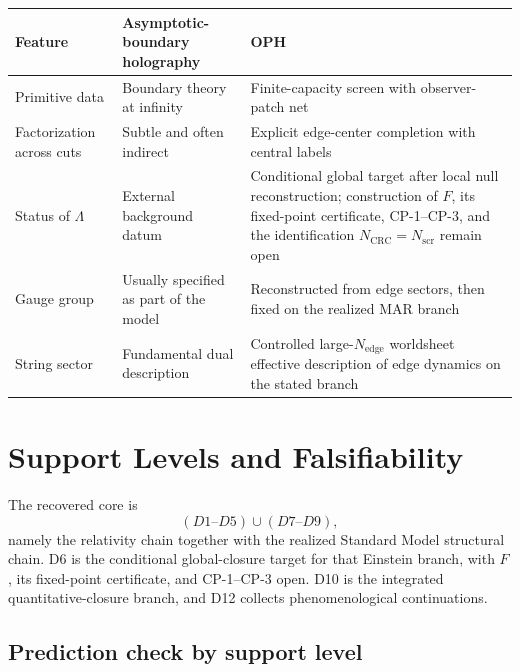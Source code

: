 \documentclass[11pt]{article}
\begin{document}
\begingroup
\footnotesize
\begin{tabular}{@{}>{\raggedright\arraybackslash}p{}>{\raggedright\arraybackslash}p{}>{\raggedright\arraybackslash}p{}@{}}
\toprule
Feature & Asymptotic-boundary holography & OPH \\
\midrule
Primitive data & Boundary theory at infinity & Finite-capacity screen with observer-patch net \\
Factorization across cuts & Subtle and often indirect & Explicit edge-center completion with central labels \\
Status of $\Lambda$ & External background datum & Conditional global target after local null reconstruction; construction of \(F\), its fixed-point certificate, CP-1--CP-3, and the identification \(N_{\mathrm{CRC}}=N_{\mathrm{scr}}\) remain open \\
Gauge group & Usually specified as part of the model & Reconstructed from edge sectors, then fixed on the realized MAR branch \\
String sector & Fundamental dual description & Controlled large-$N_{\mathrm{edge}}$ worldsheet effective description of edge dynamics on the stated branch \\
\bottomrule
\end{tabular}
\endgroup

\section{Support Levels and Falsifiability}\label{sec:claim-tiers}

The recovered core is
\[
(D1\text{--}D5)\cup(D7\text{--}D9),
\]
namely the relativity chain together with the realized Standard Model structural chain. D6 is the
conditional global-closure target for that Einstein branch, with \(F\), its fixed-point certificate,
and CP-1--CP-3 open. D10 is the integrated quantitative-closure branch, and D12 collects
phenomenological continuations.

\subsection{Prediction check by support level}
\end{document}
